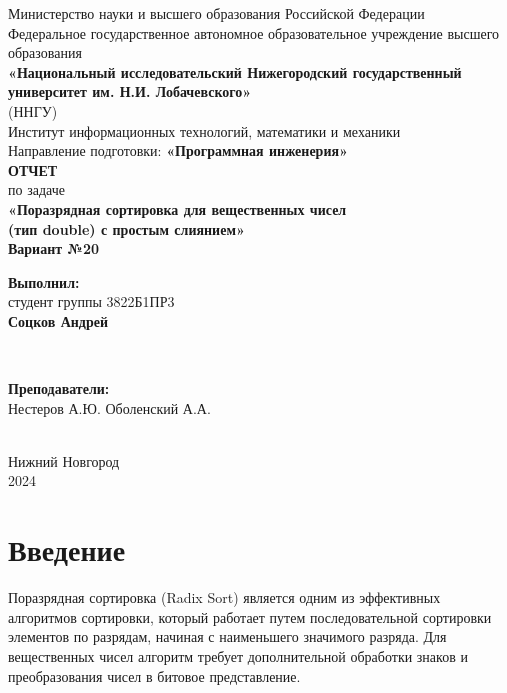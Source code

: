 \documentclass[12pt]{article}
\begin{document}
\begin{titlepage}
    \centering
    \large
    Министерство науки и высшего образования Российской Федерации\\[0.5cm]
    Федеральное государственное автономное образовательное учреждение высшего образования\\[0.5cm]
    \textbf{«Национальный исследовательский Нижегородский государственный университет им. Н.И. Лобачевского»}\\
    (ННГУ)\\[1cm]
    Институт информационных технологий, математики и механики\\[0.5cm]
    Направление подготовки: \textbf{«Программная инженерия»}\\[2cm]

    \vfill %
    {\LARGE \textbf{ОТЧЕТ}}\\[0.5cm]
    {\Large по задаче}\\[0.5cm]
    {\LARGE \textbf{«Поразрядная сортировка для вещественных чисел \\[0.3cm] (тип double) с простым слиянием»}}\\[0.5cm]
    {\Large \textbf{Вариант №20}}\\[2.5cm]

    \hfill\parbox{0.5\textwidth}{
        \textbf{Выполнил:} \\
        студент группы 3822Б1ПР3 \\
        \textbf{Соцков Андрей}
    }\\[0.5cm]

    \hfill\parbox{0.5\textwidth}{
        \textbf{Преподаватели:} \\
        Нестеров А.Ю.
        Оболенский А.А.
        
    }\\[2cm]

    Нижний Новгород\\
    2024
\end{titlepage}


\thispagestyle{empty}
\clearpage
{} 
\setcounter{page}{2} 
\tableofcontents
\clearpage
\setcounter{page}{3} 
\section{Введение}

\hspace*{1.25em}Поразрядная сортировка (Radix Sort) является одним из эффективных алгоритмов сортировки, который работает путем последовательной сортировки элементов по разрядам, начиная с наименьшего значимого разряда. Для вещественных чисел алгоритм требует дополнительной обработки знаков и преобразования чисел в битовое представление.
\end{document}
